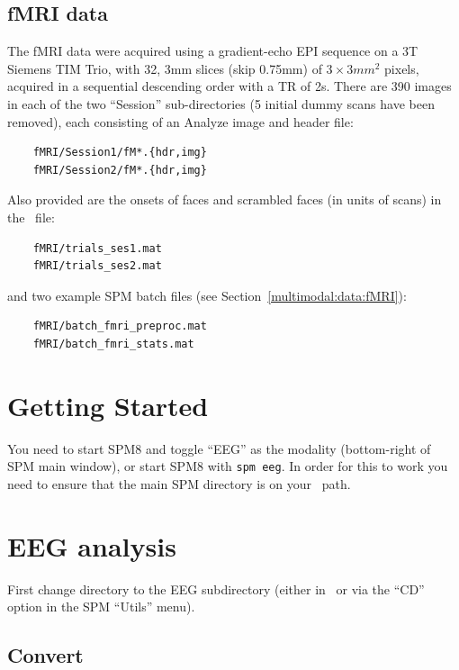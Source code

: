 \subsection{fMRI data}

The fMRI data were acquired using a gradient-echo EPI sequence on a 3T Siemens TIM Trio, with 32, 3mm slices (skip 0.75mm) of $3\times 3 mm^2$ pixels, acquired in a sequential descending order with a TR of 2s. There are 390 images in each of the two ``Session'' sub-directories (5 initial dummy scans have been removed), each consisting of an Analyze image and header file:
\begin{verbatim}
    fMRI/Session1/fM*.{hdr,img}
    fMRI/Session2/fM*.{hdr,img}
\end{verbatim}
Also provided are the onsets of faces and scrambled faces (in units of scans) in the \matlab\ file:
\begin{verbatim}
    fMRI/trials_ses1.mat
    fMRI/trials_ses2.mat
\end{verbatim}
and two example SPM batch files (see Section~\ref{multimodal:data:fMRI}):
\begin{verbatim}
    fMRI/batch_fmri_preproc.mat
    fMRI/batch_fmri_stats.mat
\end{verbatim}


\section{Getting Started}

You need to start SPM8 and toggle ``EEG'' as the modality (bottom-right of SPM main window), or start SPM8 with \texttt{spm eeg}. In order for this to work you need to ensure that the main SPM directory is on your \matlab\ path.

\section{EEG analysis}

First change directory to the EEG subdirectory (either in \matlab\, or via the ``CD'' option in the SPM ``Utils'' menu).

\subsection{Convert}

